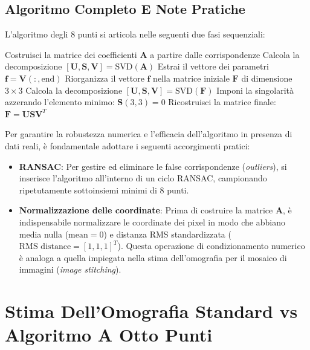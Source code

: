 ﻿\documentclass[11pt, a4paper]{article}
\begin{document}
\subsection{Algoritmo Completo E Note Pratiche}

L'algoritmo degli 8 punti si articola nelle seguenti due fasi sequenziali:

\begin{algorithm}[H]
    \caption{Algoritmo degli 8 punti per la stima di F}
    \Inizializza\;
    Costruisci la matrice dei coefficienti $\bm{A}$ a partire dalle corrispondenze\;
    Calcola la decomposizione $[\bm{U}, \bm{S}, \bm{V}] = \text{SVD}(\bm{A})$\;
    Estrai il vettore dei parametri $\bm{f} = \bm{V}(:, \text{end})$\;
    Riorganizza il vettore $\bm{f}$ nella matrice iniziale $\bm{F}$ di dimensione $3 \times 3$\;
    Calcola la decomposizione $[\bm{U}, \bm{S}, \bm{V}] = \text{SVD}(\bm{F})$\;
    Imponi la singolarità azzerando l'elemento minimo: $\bm{S}(3,3) = 0$\;
    Ricostruisci la matrice finale: $\bm{F} = \bm{U} \bm{S} \bm{V}^T$\;
\end{algorithm}

Per garantire la robustezza numerica e l'efficacia dell'algoritmo in presenza di dati reali, è fondamentale adottare i seguenti accorgimenti pratici:
\begin{itemize}[noitemsep]
    \item \textbf{RANSAC}: Per gestire ed eliminare le false corrispondenze (\emph{outliers}), si inserisce l'algoritmo all'interno di un ciclo RANSAC, campionando ripetutamente sottoinsiemi minimi di 8 punti.
    \item \textbf{Normalizzazione delle coordinate}: Prima di costruire la matrice $\bm{A}$, è indispensabile normalizzare le coordinate dei pixel in modo che abbiano media nulla ($\text{mean} = 0$) e distanza RMS standardizzata ($\text{RMS distance} = [1, 1, 1]^T$). Questa operazione di condizionamento numerico è analoga a quella impiegata nella stima dell'omografia per il mosaico di immagini (\emph{image stitching}).
\end{itemize}

\section{Stima Dell'Omografia Standard vs Algoritmo A Otto Punti}
\end{document}
